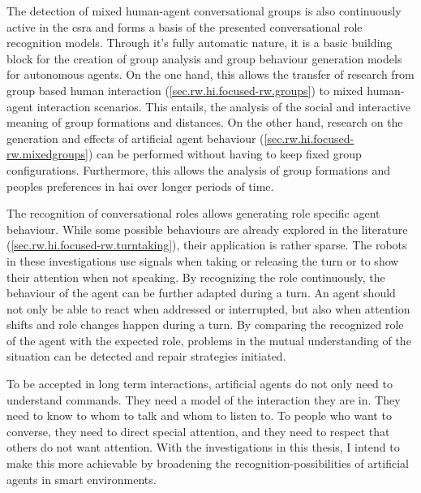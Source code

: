The detection of mixed human-agent \glspl{conversational group} is also continuously active in the \gls{csra} and forms a basis of the presented \gls{conversational role} recognition models.
Through it's fully automatic nature, it is a basic building block for the creation of group analysis and group behaviour generation models for \glspl{autonomous agent}.
On the one hand, this allows the transfer of research from group based human interaction (\cref{sec.rw.hi.focused-rw.groups}) to mixed human-agent interaction scenarios.
This entails, the analysis of the social and interactive meaning of group formations and distances.
On the other hand, research on the generation and effects of \gls{artificial agent} behaviour (\cref{sec.rw.hi.focused-rw.mixedgroups}) can be performed without having to keep fixed group configurations.
Furthermore, this allows the analysis of group formations and peoples preferences in \gls{hai} over longer periods of time.

The recognition of \glspl{conversational role} allows generating role specific agent behaviour.
While some possible behaviours are already explored in the literature (\cref{sec.rw.hi.focused-rw.turntaking}), their application is rather sparse.
The \glspl{robot} in these investigations use  signals when taking or releasing the \gls{turn} or to show their attention when not speaking.
By recognizing the role continuously, the behaviour of the agent can be further adapted during a \gls{turn}.
An agent should not only be able to react when addressed or interrupted, but also when attention shifts and role changes happen during a \gls{turn}.
By comparing the recognized role of the agent with the expected role, problems in the mutual understanding of the situation can be detected and repair strategies initiated.

To be accepted in long term interactions, \glspl{artificial agent} do not only need to understand commands.
They need a model of the interaction they are in.
They need to know to whom to talk and whom to listen to.
To people who want to converse, they need to direct special attention, and they need to respect that others do not want attention.
With the investigations in this thesis, I intend to make this more achievable by broadening the recognition-possibilities of \glspl{artificial agent} in \glspl{smart environment}.